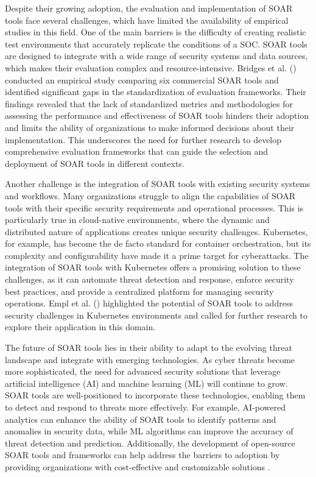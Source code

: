 Despite their growing adoption, the evaluation and implementation of SOAR tools face several challenges, which have limited the availability of empirical studies in this field. One of the main barriers is the difficulty of creating realistic test environments that accurately replicate the conditions of a SOC. SOAR tools are designed to integrate with a wide range of security systems and data sources, which makes their evaluation complex and resource-intensive. Bridges et al. (\citeyear{bridges2023}) conducted an empirical study comparing six commercial SOAR tools and identified significant gaps in the standardization of evaluation frameworks. Their findings revealed that the lack of standardized metrics and methodologies for assessing the performance and effectiveness of SOAR tools hinders their adoption and limits the ability of organizations to make informed decisions about their implementation. This underscores the need for further research to develop comprehensive evaluation frameworks that can guide the selection and deployment of SOAR tools in different contexts.

Another challenge is the integration of SOAR tools with existing security systems and workflows. Many organizations struggle to align the capabilities of SOAR tools with their specific security requirements and operational processes. This is particularly true in cloud-native environments, where the dynamic and distributed nature of applications creates unique security challenges. Kubernetes, for example, has become the de facto standard for container orchestration, but its complexity and configurability have made it a prime target for cyberattacks. The integration of SOAR tools with Kubernetes offers a promising solution to these challenges, as it can automate threat detection and response, enforce security best practices, and provide a centralized platform for managing security operations. Empl et al. (\citeyear{empl2022}) highlighted the potential of SOAR tools to address security challenges in Kubernetes environments and called for further research to explore their application in this domain.

The future of SOAR tools lies in their ability to adapt to the evolving threat landscape and integrate with emerging technologies. As cyber threats become more sophisticated, the need for advanced security solutions that leverage artificial intelligence (AI) and machine learning (ML) will continue to grow. SOAR tools are well-positioned to incorporate these technologies, enabling them to detect and respond to threats more effectively. For example, AI-powered analytics can enhance the ability of SOAR tools to identify patterns and anomalies in security data, while ML algorithms can improve the accuracy of threat detection and prediction. Additionally, the development of open-source SOAR tools and frameworks can help address the barriers to adoption by providing organizations with cost-effective and customizable solutions \citep{bridges2023, empl2022}.

